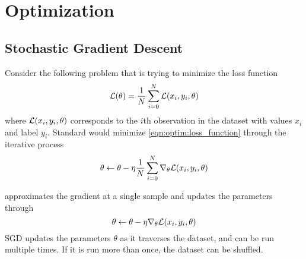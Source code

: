 \section{Optimization}

\subsection{Stochastic Gradient Descent}

Consider the following problem that is trying to minimize the loss function
\begin{equation}
    \mathcal{L}(\theta) = \frac{1}{N}\sum^N_{i=0} \mathcal{L}(x_i, y_i, \theta)
    \label{eqn:optim:loss_function}
\end{equation}
where $\mathcal{L}(x_i, y_i, \theta)$ corresponds to the $i$th observation in the dataset with values $x_i$ and label $y_i$.
Standard  would minimize \autoref{eqn:optim:loss_function} through the iterative process
\begin{equation}
    \theta \leftarrow \theta - \eta \frac{1}{N}\sum^N_{i=0}  \nabla_\theta\mathcal{L}(x_i, y_i, \theta)
\end{equation}

\cite{kiefer_stochastic_1952}
 approximates the gradient at a single sample and updates the parameters through
\begin{equation}
    \theta \leftarrow \theta - \eta\nabla_\theta\mathcal{L}(x_i, y_i, \theta)
\end{equation}
SGD updates the parameters $\theta$ as it traverses the dataset, and can be run multiple times. If it is run more than once, the dataset can be shuffled.

